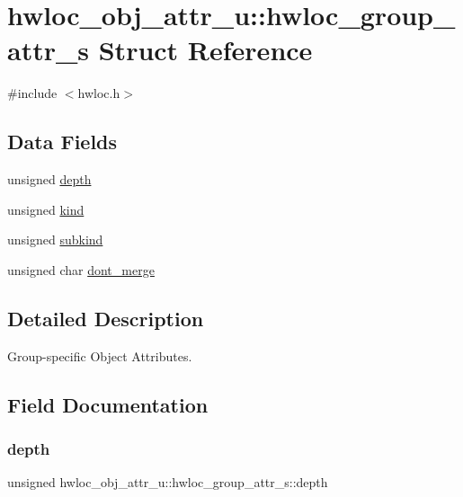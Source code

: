 \hypertarget{a00258}{}\section{hwloc\+\_\+obj\+\_\+attr\+\_\+u\+:\+:hwloc\+\_\+group\+\_\+attr\+\_\+s Struct Reference}
\label{a00258}


{\ttfamily \#include $<$hwloc.\+h$>$}

\subsection*{Data Fields}
\begin{DoxyCompactItemize}
\item 
unsigned \hyperlink{a00258_ad914eac61c77481e1b7037877bcc5579}{depth}
\item 
unsigned \hyperlink{a00258_a3229f269c4cc7e63492c168535e4f0c1}{kind}
\item 
unsigned \hyperlink{a00258_ad514d943960a4036ed5e44dc187c74ed}{subkind}
\item 
unsigned char \hyperlink{a00258_afa253d4b70f92e940c226d61f192054f}{dont\+\_\+merge}
\end{DoxyCompactItemize}


\subsection{Detailed Description}
Group-\/specific Object Attributes. 

\subsection{Field Documentation}
\mbox{\label{a00258_ad914eac61c77481e1b7037877bcc5579}} 
\subsubsection{\texorpdfstring{depth}{depth}}
{\footnotesize\ttfamily unsigned hwloc\+\_\+obj\+\_\+attr\+\_\+u\+::hwloc\+\_\+group\+\_\+attr\+\_\+s\+::depth}



